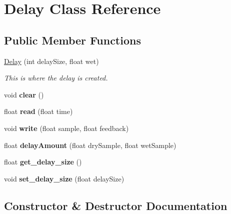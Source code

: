 \hypertarget{class_delay}{}\section{Delay Class Reference}
\label{class_delay}
\subsection*{Public Member Functions}
\begin{DoxyCompactItemize}
\item 
\hyperlink{class_delay_afae181d7b636941e744bdfd46afe3848}{Delay} (int delay\+Size, float wet)
\begin{DoxyCompactList}\small\item\em This is where the delay is created. \end{DoxyCompactList}\item 
void {\bfseries clear} ()\hypertarget{class_delay_aaf915f5e3f9f5d1c1391459fb90a433f}{}\label{class_delay_aaf915f5e3f9f5d1c1391459fb90a433f}

\item 
float {\bfseries read} (float time)\hypertarget{class_delay_a97ee98d458fc7291e4f6d808fb0f5b29}{}\label{class_delay_a97ee98d458fc7291e4f6d808fb0f5b29}

\item 
void {\bfseries write} (float sample, float feedback)\hypertarget{class_delay_a7c88a203b77cdaa73b2c3eb0dbfaf584}{}\label{class_delay_a7c88a203b77cdaa73b2c3eb0dbfaf584}

\item 
float {\bfseries delay\+Amount} (float dry\+Sample, float wet\+Sample)\hypertarget{class_delay_a05a8dc8fb448ff4319de1f779f5ab4f8}{}\label{class_delay_a05a8dc8fb448ff4319de1f779f5ab4f8}

\item 
float {\bfseries get\+\_\+delay\+\_\+size} ()\hypertarget{class_delay_aa2eae7a9ce78e8ca242b12163d6e75f9}{}\label{class_delay_aa2eae7a9ce78e8ca242b12163d6e75f9}

\item 
void {\bfseries set\+\_\+delay\+\_\+size} (float delay\+Size)\hypertarget{class_delay_a948c7b9fae46d488ba88fde80579e612}{}\label{class_delay_a948c7b9fae46d488ba88fde80579e612}

\end{DoxyCompactItemize}


\subsection{Constructor \& Destructor Documentation}
